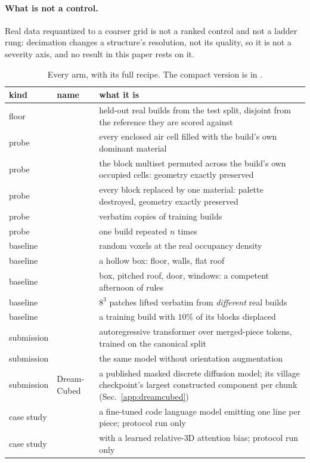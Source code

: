 \paragraph{What is not a control.} Real data requantized to a coarser grid is
not a ranked control and not a ladder rung: decimation changes a structure's
resolution, not its quality, so it is not a severity axis, and no result in this
paper rests on it.

\begin{table}[t]
\centering
\small
\caption{Every arm, with its full recipe. The compact version is
 in .}
\label{tab:arms-full}
\begin{tabular}{llp{7.4cm}}
\toprule
kind & name & what it is \\
\midrule
floor      & \realheld{}      & held-out real builds from the test split, disjoint from the reference they are scored against \\
\midrule
probe      & \solidify{}      & every enclosed air cell filled with the build's own dominant material \\
probe      & \matshuffle{}    & the block multiset permuted across the build's own occupied cells: geometry exactly preserved \\
probe      & \monochrome{}    & every block replaced by one material: palette destroyed, geometry exactly preserved \\
probe      & \traincopy{}     & verbatim copies of training builds \\
probe      & \singlemode{}    & one build repeated $n$ times \\
\midrule
baseline   & \randomvox{}     & random voxels at the real occupancy density \\
baseline   & \hollowbox{}     & a hollow box: floor, walls, flat roof \\
baseline   & \gabled{}        & box, pitched roof, door, windows: a competent afternoon of rules \\
baseline   & \patchstitch{}   & $8^3$ patches lifted verbatim from \emph{different} real builds \\
baseline   & \copynoise{}     & a training build with $10\%$ of its blocks displaced \\
\midrule
submission & \voxar{}         & autoregressive transformer over merged-piece tokens, trained on the canonical split \\
submission & \voxarun{}       & the same model without orientation augmentation \\
submission & Dream-Cubed      & a published masked discrete diffusion model; its village checkpoint's largest constructed component per chunk (Sec.~\ref{app:dreamcubed}) \\
case study & \llmft{}         & a fine-tuned code language model emitting one line per piece; protocol run only \\
case study & \llmgeo{}        & \llmft{} with a learned relative-{3D} attention bias; protocol run only \\
\bottomrule
\end{tabular}
\end{table}


